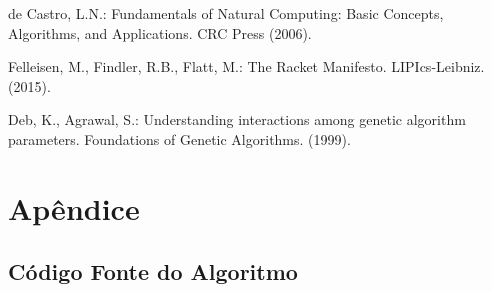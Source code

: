 \documentclass{llncs}
\begin{document}
%
%
\begin{thebibliography}{5}
%

de Castro, L.N.: Fundamentals of Natural Computing: Basic Concepts, Algorithms, and Applications. CRC Press (2006).

Felleisen, M., Findler, R.B., Flatt, M.: The Racket Manifesto. LIPIcs-Leibniz. (2015).

Deb, K., Agrawal, S.: Understanding interactions among genetic algorithm parameters. Foundations of Genetic Algorithms. (1999).

\end{thebibliography}

\section*{Apêndice}

\subsection*{Código Fonte do Algoritmo}
\end{document}
